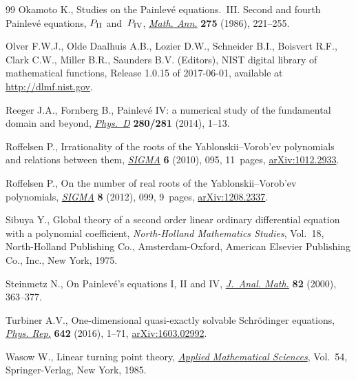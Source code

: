 \documentclass[pdftex]{sigma}
\numberwithin{equation}{section}
\begin{document}
\begin{thebibliography}{99}
Okamoto K., Studies on the {P}ainlev\'e equations.~{III}. {S}econd and fourth
 {P}ainlev\'e equations, {$P_{{\rm II}}$} and~{$P_{{\rm IV}}$}, \href{https://doi.org/10.1007/BF01458459}{\textit{Math.
 Ann.}} \textbf{275} (1986), 221--255.

Olver F.W.J., Olde Daalhuis A.B., Lozier D.W., Schneider B.I., Boisvert R.F., Clark C.W., Miller B.R., Saunders B.V. (Editors), NIST digital library of mathematical functions, {R}elease 1.0.15 of 2017-06-01, {a}vailable at \url{http://dlmf.nist.gov}.

Reeger J.A., Fornberg B., Painlev\'e {IV}: a numerical study of the fundamental
 domain and beyond, \href{https://doi.org/10.1016/j.physd.2014.04.006}{\textit{Phys.~D}} \textbf{280/281} (2014), 1--13.

Rof\/felsen P., Irrationality of the roots of the {Y}ablonskii--{V}orob'ev
 polynomials and relations between them, \href{https://doi.org/10.3842/SIGMA.2010.095}{\textit{SIGMA}} \textbf{6} (2010),
 095, 11~pages, \href{https://arxiv.org/abs/1012.2933}{arXiv:1012.2933}.

Rof\/felsen P., On the number of real roots of the {Y}ablonskii--{V}orob'ev
 polynomials, \href{https://doi.org/10.3842/SIGMA.2012.099}{\textit{SIGMA}} \textbf{8} (2012), 099, 9~pages,
 \href{https://arxiv.org/abs/1208.2337}{arXiv:1208.2337}.

Sibuya Y., Global theory of a second order linear ordinary dif\/ferential
 equation with a polynomial coef\/f\/icient, \textit{North-Holland Mathematics
 Studies}, Vol.~18, North-Holland Publishing Co., Amsterdam-Oxford, American
 Elsevier Publishing Co., Inc., New York, 1975.

Steinmetz N., On {P}ainlev\'e's equations {I}, {II} and {IV}, \href{https://doi.org/10.1007/BF02791235}{\textit{J.~Anal.
 Math.}} \textbf{82} (2000), 363--377.

Turbiner A.V., One-dimensional quasi-exactly solvable {S}chr\"odinger
 equations, \href{https://doi.org/10.1016/j.physrep.2016.06.002}{\textit{Phys. Rep.}} \textbf{642} (2016), 1--71,
 \href{https://arxiv.org/abs/1603.02992}{arXiv:1603.02992}.

Wasow W., Linear turning point theory, \href{https://doi.org/10.1007/978-1-4612-1090-0}{\textit{Applied Mathematical Sciences}},
 Vol.~54, Springer-Verlag, New York, 1985.

\end{thebibliography}\LastPageEnding
\end{document}
